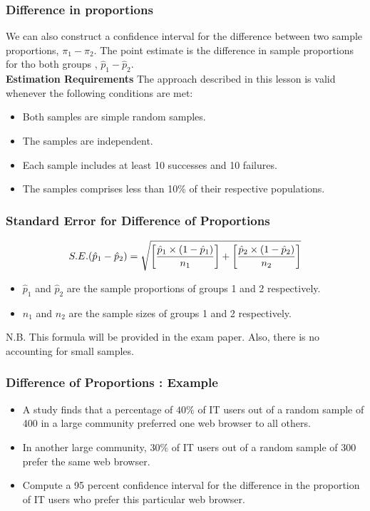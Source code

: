 \documentclass[a4]{beamer}
\begin{document}
\begin{frame}
\frametitle{Difference in proportions}
We can also construct a confidence interval for the difference between two sample proportions, $\pi_1 - \pi_2$. The point estimate is the difference in sample proportions for tho both groups , $\hat{p}_1- \hat{p}_2$.\\\bigskip
\textbf{Estimation Requirements}
The approach described in this lesson is valid whenever the following conditions are met:

\begin{itemize}
\item Both samples are simple random samples.
\item The samples are independent.
\item Each sample includes at least 10 successes and 10 failures.
\item The samples comprises less than 10\% of their respective populations.
\end{itemize}
\end{frame}



\begin{frame}
\frametitle{Standard Error for Difference of Proportions}

\[ S.E. (\hat{p}_1 - \hat{p}_2) =
\sqrt{ \left[{\hat{p}_1 \times (1 - \hat{p}_1) \over n_1}\right] + \left[{\hat{p}_2 \times (1 - \hat{p}_2) \over n_2}\right] } \]
\begin{itemize}
\item $\hat{p}_1$ and $\hat{p}_2$ are the sample proportions of groups 1 and 2 respectively.
\item $n_1$ and $n_2$ are the sample sizes of groups 1 and 2 respectively.
\end{itemize}
N.B. This formula will be provided in the exam paper. Also, there is no accounting for small samples.
\end{frame}

\begin{frame}
\frametitle{ Difference of Proportions : Example}
\begin{itemize} \item
A study finds that a percentage of $40\%$ of IT users out of a random sample of 400 in a large
community preferred one web browser to all others. \item In another large community, $30\%$ of IT users out of a random sample
of 300 prefer the same web browser. \item Compute a 95 percent confidence interval for the difference in the proportion of IT users who prefer this particular web browser. \end{itemize}
\end{frame}
\end{document}
